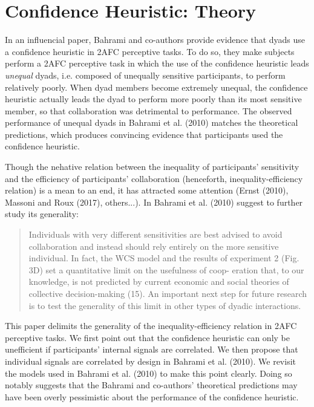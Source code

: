\documentclass[12pt]{report}
\begin{document}
\chapter*{Confidence Heuristic: Theory}
In an influencial paper, Bahrami and co-authors provide evidence that dyads use a confidence heuristic in 2AFC perceptive tasks. To do so, they make subjects perform a 2AFC perceptive task in which the use of the confidence heuristic leads \textit{unequal} dyads, i.e. composed of unequally sensitive participants, to perform relatively poorly. When dyad members become extremely unequal, the confidence heuristic actually leads the dyad to perform more poorly than its most sensitive member, so that collaboration was detrimental to performance. The observed performance of unequal dyads in Bahrami et al. (2010) matches the theoretical predictions, which produces convincing evidence that participants used the confidence heuristic. 

Though the nehative relation between the inequality of participants' sensitivity and the efficiency of participants' collaboration (henceforth, inequality-efficiency relation) is a mean to an end, it has attracted some attention (Ernst (2010), Massoni and Roux (2017), others...). In Bahrami et al. (2010) suggest to further study its generality: 

\begin{quote} Individuals with very
different sensitivities are best advised to avoid
collaboration and instead should rely entirely on
the more sensitive individual. In fact, the WCS
model and the results of experiment 2 (Fig. 3D)
set a quantitative limit on the usefulness of coop-
eration that, to our knowledge, is not predicted by
current economic and social theories of collective
decision-making (15). An important next step for
future research is to test the generality of this limit
in other types of dyadic interactions. \end{quote}

This paper delimits the generality of the inequality-efficiency relation in 2AFC perceptive tasks. We first point out that the confidence heuristic can only be unefficient if participants' internal signals are correlated. We then propose that individual signals are correlated by design in Bahrami et al. (2010). We revisit the models used in Bahrami et al. (2010) to make this point clearly. Doing so notably suggests that the Bahrami and co-authors' theoretical predictions may have been overly pessimistic about the performance of the confidence heuristic. 
\end{document}
